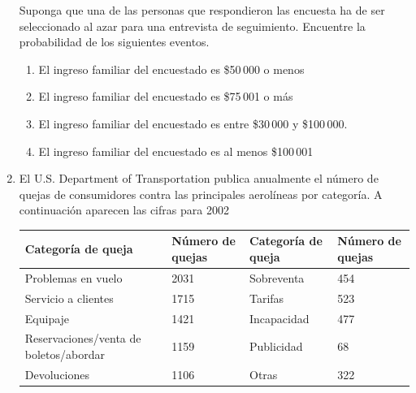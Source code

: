 \documentclass[11pt,twoside]{article}
\begin{document}
\begin{enumerate}
\begin{table}[!h]
            \end{table} 
Suponga que una de las personas que respondieron las encuesta ha de ser seleccionado al azar para una entrevista de seguimiento. Encuentre la probabilidad de los siguientes eventos.
\begin{enumerate}
 \item El ingreso familiar del encuestado es \$50\,000 o menos
 \item El ingreso familiar del encuestado es \$75\,001 o más
 \item El ingreso familiar del encuestado es entre \$30\,000 y \$100\,000.
 \item El ingreso familiar del encuestado es al menos \$100\,001
\end{enumerate}
\item El U.S. Department of Transportation publica
anualmente el número de quejas de consumidores
contra las principales aerolíneas por categoría. A continuación aparecen las cifras para 2002
\begin{table}[!h]
 \begin{center}
\begin{tabular}{p{3.5cm}p{2cm}|lp{2cm}}
Categoría de queja & Número de quejas & Categoría de queja & Número de quejas\\ \hline
Problemas en vuelo & 2031 & Sobreventa & 454\\
Servicio a clientes & 1715 & Tarifas & 523\\
Equipaje & 1421 & Incapacidad & 477\\
Reservaciones/venta de boletos/abordar & 1159 & Publicidad & 68\\
Devoluciones & 1106 & Otras & 322 \\ \hline
 \end{tabular}
 \end{center}


\end{table}
\end{enumerate}
\end{document}

